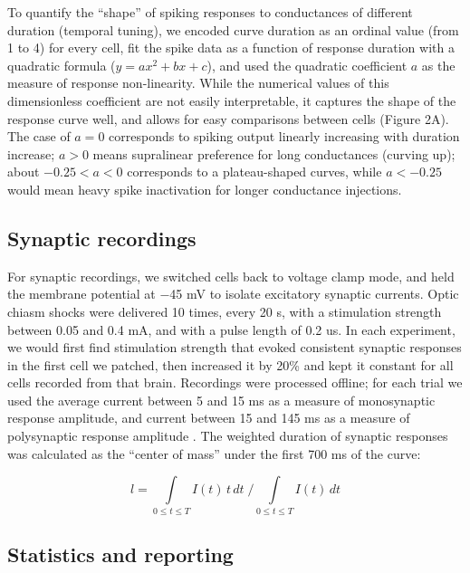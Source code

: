 \documentclass{article}
\begin{document}
To quantify the “shape” of spiking responses to conductances of different duration (temporal tuning), we encoded curve duration as an ordinal value (from 1 to 4) for every cell, fit the spike data as a function of response duration with a quadratic formula ($y = ax^2 + bx +c$), and used the quadratic coefficient $a$ as the measure of response non-linearity. While the numerical values of this dimensionless coefficient are not easily interpretable, it captures the shape of the response curve well, and allows for easy comparisons between cells (Figure 2A). The case of $a=0$ corresponds to spiking output linearly increasing with duration increase; $a>0$ means supralinear preference for long conductances (curving up); about $-0.25<a<0$ corresponds to a plateau-shaped curves, while $a<-0.25$ would mean heavy spike inactivation for longer conductance injections. 

\subsection*{Synaptic recordings}

For synaptic recordings, we switched cells back to voltage clamp mode, and held the membrane potential at $-$45 mV to isolate excitatory synaptic currents. Optic chiasm shocks were delivered 10 times, every 20 s, with a stimulation strength between 0.05 and 0.4 mA, and with a pulse length of 0.2 us. In each experiment, we would first find stimulation strength that evoked consistent synaptic responses in the first cell we patched, then increased it by 20\% and kept it constant for all cells recorded from that brain. Recordings were processed offline; for each trial we used the average current between 5 and 15 ms as a measure of monosynaptic response amplitude, and current between 15 and 145 ms as a measure of polysynaptic response amplitude \citep{ciarleglio2015}. The weighted duration of synaptic responses was calculated as the “center of mass” under the first 700 ms of the curve:

$$\displaystyle l=\int\limits_{0 \leq t \leq T}{I(t)\, t \, dt} \; \Big/ \int\limits_{0 \leq t \leq T}{I(t) \, dt}$$

\subsection*{Statistics and reporting}
\end{document}
